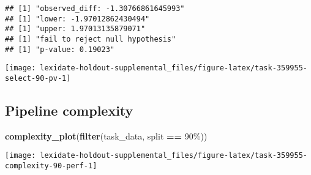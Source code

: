 \documentclass[
]{book}
\newenvironment{Shaded}{\begin{snugshade}}{\end{snugshade}}
\newcommand{\AttributeTok}[1]{\textcolor[rgb]{0.13,0.29,0.53}{#1}}
\newcommand{\DecValTok}[1]{\textcolor[rgb]{0.00,0.00,0.81}{#1}}
\newcommand{\FunctionTok}[1]{\textcolor[rgb]{0.13,0.29,0.53}{\textbf{#1}}}
\newcommand{\NormalTok}[1]{#1}
\newcommand{\OtherTok}[1]{\textcolor[rgb]{0.56,0.35,0.01}{#1}}
\newcommand{\SpecialCharTok}[1]{\textcolor[rgb]{0.81,0.36,0.00}{\textbf{#1}}}
\newcommand{\StringTok}[1]{\textcolor[rgb]{0.31,0.60,0.02}{#1}}
\begin{document}
\begin{Shaded}
\end{Shaded}

\begin{verbatim}
## [1] "observed_diff: -1.30766861645993"
## [1] "lower: -1.97012862430494"
## [1] "upper: 1.97013135879071"
## [1] "fail to reject null hypothesis"
## [1] "p-value: 0.19023"
\end{verbatim}

\texttt{[image: lexidate-holdout-supplemental\_files/figure-latex/task-359955-select-90-pv-1]}

\hypertarget{pipeline-complexity-13}{%
\subsection{Pipeline complexity}\label{pipeline-complexity-13}}

\begin{Shaded}
\begin{Highlighting}[]
\FunctionTok{complexity\_plot}\NormalTok{(}\FunctionTok{filter}\NormalTok{(task\_data, split }\SpecialCharTok{==} \StringTok{\textquotesingle{}90\%\textquotesingle{}}\NormalTok{))}
\end{Highlighting}
\end{Shaded}

\texttt{[image: lexidate-holdout-supplemental\_files/figure-latex/task-359955-complexity-90-perf-1]}
\end{document}

